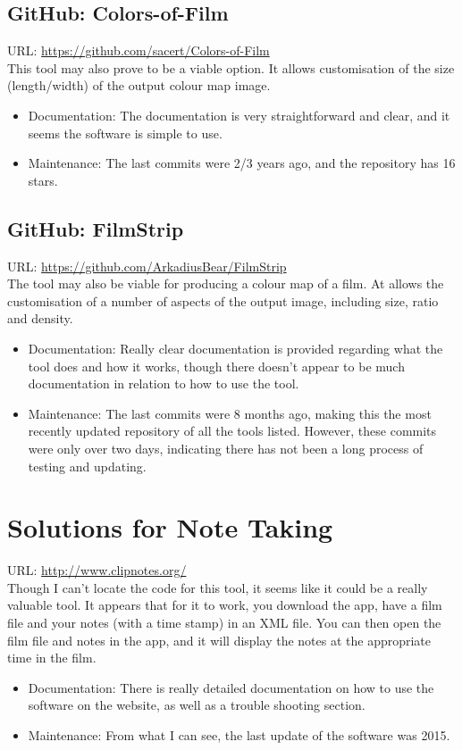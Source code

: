 \documentclass{article}
\begin{document}
\subsection{GitHub: Colors-of-Film}
URL: \url{https://github.com/sacert/Colors-of-Film}\\
This tool may also prove to be a viable option. It allows customisation of the size (length/width) of the output colour map image.
\begin{itemize}
    \item Documentation: The documentation is very straightforward and clear, and it seems the software is simple to use.
    \item Maintenance: The last commits were 2/3 years ago, and the repository has 16 stars.
\end{itemize}

\subsection{GitHub: FilmStrip}
URL: \url{https://github.com/ArkadiusBear/FilmStrip}\\
The tool may also be viable for producing a colour map of a film. At allows the customisation of a number of aspects of the output image, including size, ratio and density.

\begin{itemize}
    \item Documentation: Really clear documentation is provided regarding what the tool does and how it works, though there doesn't appear to be much documentation in relation to how to use the tool.
    \item Maintenance: The last commits were 8 months ago, making this the most recently updated repository of all the tools listed. However, these commits were only over two days, indicating there has not been a long process of testing and updating.
\end{itemize}
 
\section*{Solutions for Note Taking}
URL: \url{http://www.clipnotes.org/}\\
Though I can't locate the code for this tool, it seems like it could be a really valuable tool. It appears that for it to work, you download the app, have a film file and your notes (with a time stamp) in an XML file. You can then open the film file and notes in the app, and it will display the notes at the appropriate time in the film.
\begin{itemize}
    \item Documentation: There is really detailed documentation on how to use the software on the website, as well as a trouble shooting section.
    \item Maintenance: From what I can see, the last update of the software was 2015.
\end{itemize}
\end{document}

